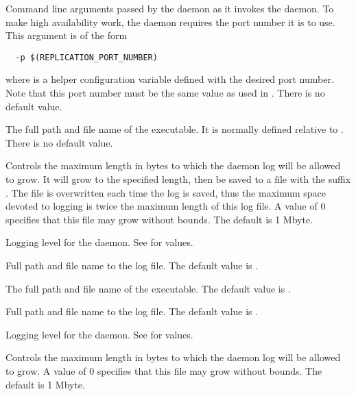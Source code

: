 \begin{description}
\label{param:ReplicationArgs}
\item[\Macro{REPLICATION\_ARGS}]
  Command line arguments passed by the  daemon
  as it invokes the  daemon.
  To make high availability work, the  daemon
  requires the port number it is to use.
  This argument is of the form
  \begin{verbatim}
  -p $(REPLICATION_PORT_NUMBER)
  \end{verbatim}
  where  is a helper configuration
  variable defined with the desired port number.
  Note that this port number must be the same value as
  used in .
  There is no default value.

\label{param:Replication}
\item[\Macro{REPLICATION}]
  The full path and file name of the  executable.
  It is normally defined relative to .
  There is no default value.

\label{param:MaxReplicationLog}
\item[\Macro{MAX\_REPLICATION\_LOG}]
  Controls the maximum length in bytes to which the 
  daemon log will be allowed to grow. It will grow to the specified length,
  then be saved to a file with the suffix .
  The   file is overwritten each time the log is saved,
  thus the maximum space devoted to logging is twice the maximum length
  of this log file.
  A value of 0 specifies that this file may grow without bounds.
  The default is 1 Mbyte.

\label{param:ReplicationDebug}
\item[\Macro{REPLICATION\_DEBUG}]
  Logging level for the  daemon.
  See  for values.

\label{param:ReplicationLog}
\item[\Macro{REPLICATION\_LOG}]
  Full path and file name to the log file.
  The default value is .

\label{param:Transferer}
\item[\Macro{TRANSFERER}]
  The full path and file name of the  executable.
  The default value is .

\label{param:TransfererLog}
\item[\Macro{TRANSFERER\_LOG}]
  Full path and file name to the log file.
  The default value is .

\label{param:TransfererDebug}
\item[\Macro{TRANSFERER\_DEBUG}]
  Logging level for the  daemon.
  See  for values.

\label{param:MaxTransfererLog}
\item[\Macro{MAX\_TRANSFERER\_LOG}]
  Controls the maximum length in bytes to which the 
  daemon log will be allowed to grow.
  A value of 0 specifies that this file may grow without bounds.
  The default is 1 Mbyte.

\end{description}

